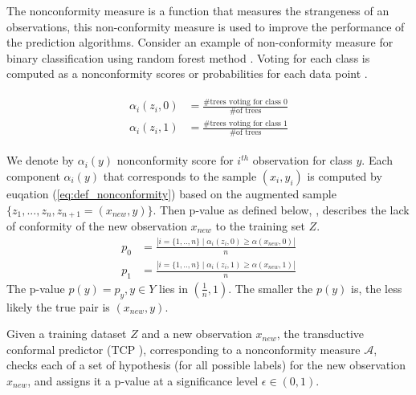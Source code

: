 \documentclass[main]{subfiles}
\begin{document}
The nonconformity measure is a function that measures the strangeness of an observations,
this non-conformity measure is used to improve the performance of the prediction algorithms. Consider an example of non-conformity measure for binary classification
using  random forest method \cite{Breiman}. Voting for each class is computed as a 
nonconformity scores or probabilities for each data point .  %

\begin{align} \label{eq:def_nonconformity}
\begin{split}
\alpha_i(z_i, 0) &= \frac{\#\text{trees voting for class 0}}{\#\text{of trees}}\\
\alpha_i(z_i, 1) &= \frac{\#\text{trees voting for class 1}}{\#\text{of trees}}
\end{split}
\end{align}

We denote by $\alpha_i(y)$ nonconformity score for $i^{th}$ observation for class $y$. Each component  $\alpha_i(y)$ that corresponds to the sample $(x_i,y_i)$ is computed by
euqation (\ref{eq:def_nonconformity}) based on the augmented sample  $\{ z_1 , ..., z_n, z_{n+1}=(x_{new},y) \}$. Then p-value as defined below, \cite{vovk2005algorithmic},  describes the lack of conformity of the  new observation $x_{new}$ to the training set $Z$. 
 \begin{align*}
 p_0 &= \frac{| i=\{1,..,n\} \mid \alpha_i(z_i, 0) \geq \alpha(x_{new}, 0) |}{n} \\
 p_1 &= \frac{| i=\{1,..,n\} \mid \alpha_i(z_i, 1) \geq \alpha(x_{new}, 1) |}{n} 
 \end{align*}
The p-value $p(y)=p_y, y \in Y$ lies in $(\frac{1}{n},1)$. The smaller the $p(y)$
 is, the less likely the true pair is $(x_{new},y)$.

 
\begin{definition}
Given a training dataset $Z$ and a new observation $x_{new}$, the transductive conformal predictor (TCP ), corresponding to a nonconformity measure $\mathcal{A}$, checks each of a set of hypothesis (for all possible labels) for the new observation $x_{new}$, and assigns it a p-value at a significance level $\epsilon \in (0, 1)$.  %
\end{definition}
\end{document}
